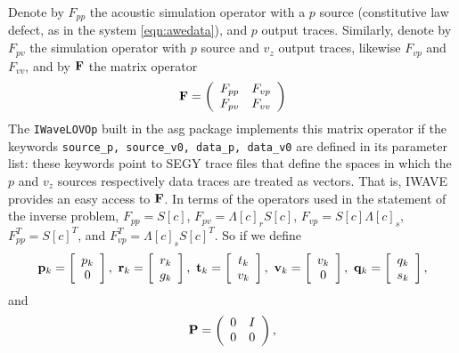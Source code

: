 Denote by $F_{pp}$ the acoustic simulation operator with a $p$ source (constitutive law defect, as in the system \ref{eqn:awedata}), and $p$ output traces. Similarly, denote by $F_{pv}$ the simulation operator with $p$ source and $v_z$ output traces, likewise $F_{vp}$ and $F_{vv}$, and by ${\bf F}$ the matrix operator
\begin{equation}
\label{eqn:iwop}
{\bf F} = \left(
\begin{array}{cc}
F_{pp} & F_{vp} \\
F_{pv} & F_{vv}
\end{array}
\right)
\end{equation}
The {\tt IWaveLOVOp} built in the asg package implements this matrix operator if the keywords {\tt source\_p, source\_v0, data\_p, data\_v0} are defined in its parameter list: these keywords point to SEGY trace files that define the spaces in which the $p$ and $v_z$ sources respectively data traces are treated as vectors. That is, IWAVE provides an easy access to ${\bf F}$. In terms of the operators used in the statement of the inverse problem, $F_{pp}=S[c]$, $F_{pv}=\Lambda[c]_rS[c]$, $F_{vp} = S[c]\Lambda[c]_s$, $F_{pp}^T = S[c]^T$, and $F_{vp}^T = \Lambda[c]_sS[c]^T$. So if we define 
\begin{equation}
\label{eqn:vecvec}
{\bf p}_k = \left[
\begin{array}{c}
p_k\\
0
\end{array}
\right],\,\,
{\bf r}_k = \left[
\begin{array}{c}
r_k\\
g_k
\end{array}
\right],\,\,
{\bf t}_k = \left[
\begin{array}{c}
t_k\\
v_k
\end{array}
\right],\,\,
{\bf v}_k = \left[
\begin{array}{c}
v_k\\
0
\end{array}
\right],\,\,
{\bf q}_k = \left[
\begin{array}{c}
q_k\\
s_k
\end{array}
\right],
\end{equation}
and
\begin{equation}
\label{eqn:proj}
{\bf P} = \left(
\begin{array}{cc}
0 & I \\
0 & 0
\end{array}
\right),
\end{equation}
